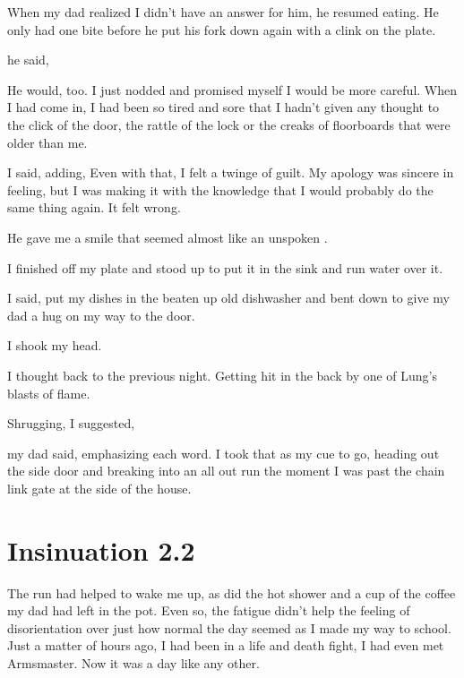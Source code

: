 When my dad realized I didn't have an answer for him, he resumed eating. He only had one bite before he put his fork down again with a clink on the plate.

 he said, 

He would, too. I just nodded and promised myself I would be more careful. When I had come in, I had been so tired and sore that I hadn't given any thought to the click of the door, the rattle of the lock or the creaks of floorboards that were older than me.

 I said, adding,  Even with that, I felt a twinge of guilt. My apology was sincere in feeling, but I was making it with the knowledge that I would probably do the same thing again. It felt wrong.

He gave me a smile that seemed almost like an unspoken .

I finished off my plate and stood up to put it in the sink and run water over it.


 I said, put my dishes in the beaten up old dishwasher and bent down to give my dad a hug on my way to the door.


I shook my head.


I thought back to the previous night. Getting hit in the back by one of Lung's blasts of flame.

Shrugging, I suggested, 

 my dad said, emphasizing each word. I took that as my cue to go, heading out the side door and breaking into an all out run the moment I was past the chain link gate at the side of the house.


\chapter{Insinuation 2.2}

The run had helped to wake me up, as did the hot shower and a cup of the coffee my dad had left in the pot. Even so, the fatigue didn't help the feeling of disorientation over just how normal the day seemed as I made my way to school. Just a matter of hours ago, I had been in a life and death fight, I had even met Armsmaster. Now it was a day like any other.

